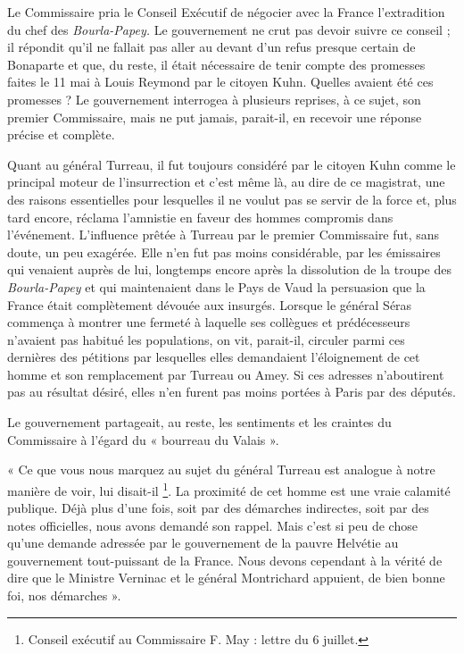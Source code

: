 \documentclass[french,twoside]{book} %
\newenvironment{quoteblock}%
  {\begin{quoting}}
  {\end{quoting}}
\newenvironment{quotebar}{%
    \def\FrameCommand{{\color{rubric!10!}\vrule width 0.5em} \hspace{0.9em}}%
    \def\OuterFrameSep{\itemsep} %
    \MakeFramed {\advance\hsize-\width \FrameRestore}
  }%
  {%
    \endMakeFramed
  }
\renewenvironment{quoteblock}%
  {%
    \savenotes
    \setstretch{0.9}
    \begin{quotebar}
  }
  {%
    \end{quotebar}
    \spewnotes
  }
\begin{document}
Le Commissaire pria le Conseil Exécutif de négocier avec la France l’extradition du chef des \emph{Bourla-Papey.} Le gouvernement ne crut pas devoir suivre ce conseil ; il répondit qu’il ne fallait pas aller au devant d’un refus presque certain de Bonaparte et que, du reste, il était nécessaire de tenir compte des promesses faites le 11 mai à Louis Reymond par le citoyen Kuhn. Quelles avaient été ces promesses ? Le gouvernement interrogea à plusieurs reprises, à ce sujet, son premier Commissaire, mais ne put jamais, parait-il, en recevoir une réponse précise et complète.\par
Quant au général Turreau, il fut toujours considéré par le citoyen Kuhn comme le principal moteur de l’insurrection et c’est même là, au dire de ce magistrat, une des raisons essentielles pour lesquelles il ne voulut pas se servir de la force et, plus tard encore, réclama l’amnistie en faveur des hommes compromis dans l’événement. L’influence prêtée à Turreau par le premier Commissaire fut, sans doute, un peu exagérée. Elle n’en fut pas moins considérable, par les émissaires qui venaient auprès de lui, longtemps encore après la dissolution de la troupe des \emph{Bourla-Papey} et qui maintenaient dans le Pays de Vaud la persuasion que la France était complètement dévouée aux insurgés. Lorsque le général Séras commença à montrer une fermeté à laquelle ses collègues et prédécesseurs n’avaient pas habitué les populations, on vit, parait-il, circuler parmi ces dernières des pétitions par lesquelles elles demandaient l’éloignement de cet homme et son remplacement par Turreau ou Amey. Si ces adresses n’aboutirent pas au résultat désiré, elles n’en furent pas moins portées à Paris par des députés.\par
Le gouvernement partageait, au reste, les sentiments et les craintes du Commissaire à l’égard du « bourreau du Valais ».\par

\begin{quoteblock}
 \noindent « Ce que vous nous marquez au sujet du général Turreau est analogue à notre manière de voir, lui disait-il \footnote{Conseil exécutif au Commissaire F. May : lettre du 6 juillet.}. La proximité de cet homme est une vraie calamité publique. Déjà plus d’une fois, soit par des démarches indirectes, soit par des notes officielles, nous avons demandé son rappel. Mais c’est si peu de chose qu’une demande adressée par le gouvernement de la pauvre Helvétie au gouvernement tout-puissant de la France. Nous devons cependant à la vérité de dire que le Ministre Verninac et le général Montrichard appuient, de bien bonne foi, nos démarches ».
 \end{quoteblock}
\end{document}
